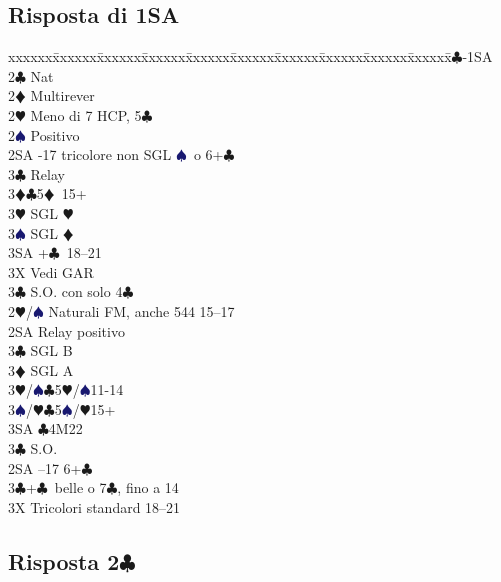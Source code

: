 \documentclass[a4paper,italian]{article}
\newcommand{\BC}{\textcolor{OliveGreen}{$\clubsuit$}}
\newcommand{\BD}{\textcolor{RedOrange}{$\vardiamondsuit$}}
\newcommand{\BH}{\textcolor{Red2}{$\varheartsuit${}}}
\newcommand{\BS}{\textcolor{MidnightBlue}{$\spadesuit${}}}
\newcommand{\pdfc}{\texorpdfstring{\BC{}}{C}}
\newenvironment{bidtable}
{\begin{tabbing}

    xxxxxx\=xxxxxx\=xxxxxx\=xxxxxx\=xxxxxx\=xxxxxx\=xxxxxx\=xxxxxx\=xxxxxx\=xxxxxx\=\kill}
{\end{tabbing} }%
\begin{document}
\begin{multicols}{2}
    \subsection{Risposta di 1SA}

    \begin{bidtable}
        1\BC-1SA\+\\
        2\BC \> Nat\\
        2\BD \> Multirever\+\\
        2\BH \> Meno di 7 HCP, 5\BC \\
        2\BS \> Positivo\+\\
        2SA -17 tricolore non SGL \BS\ o 6+\BC \+\\
        3\BC \> Relay\+\\
        3\BD {}\BC5\BD\ 15+\\
        3\BH \> SGL \BH \\
        3\BS \> SGL \BD \\
        3SA +\BC\ 18--21\-\-\\
        3X \> Vedi GAR\-\\
        3\BC \> S.O. con solo 4\BC\-\\
        2\BH/\BS \> Naturali FM, anche 544 15--17\+\\
        2SA \> Relay positivo\+\\
        3\BC \> SGL B\\
        3\BD \> SGL A\\
        3\BH/\BS {}\BC 5\BH/\BS 11-14\\
        3\BS/\BH {}\BC 5\BS/\BH 15+\\
        3SA \BC 4M22\-\\
        3\BC \> S.O.\-\\
        2SA --17 6+\BC \\
        3\BC {}+\BC\ belle o 7\BC , fino a 14\\
        3X \> Tricolori standard 18--21\-
    \end{bidtable}
\end{multicols}

\newpage

\subsection{Risposta 2\pdfc}
\end{document}
